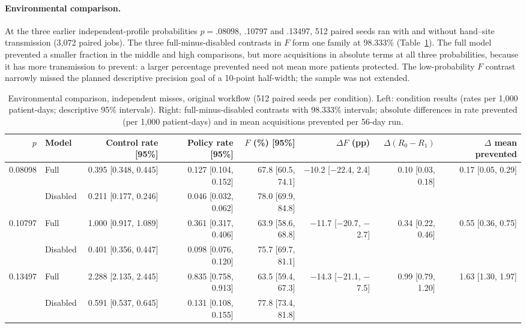 \documentclass[11pt]{article}
\newcommand{\mn}{\ensuremath{-}}
\begin{document}
\paragraph{Environmental comparison.} At the three earlier
independent-profile probabilities $p=.08098$, .10797 and .13497, 512 paired seeds
ran with and without hand--site transmission (3,072 paired jobs). The three
full-minus-disabled contrasts in $F$ form one family at 98.333\%
(Table~\ref{tab:env}). The full model prevented a smaller fraction in the middle
and high comparisons, but more acquisitions in absolute terms at all three
probabilities, because it has more transmission to prevent: a larger percentage
prevented need not mean more patients protected. The low-probability $F$
contrast narrowly missed the planned descriptive precision goal of a 10-point
half-width; the sample was not extended.

\begin{table}[htbp]\centering\footnotesize\setlength{\tabcolsep}{3pt}
\caption{Environmental comparison, independent misses, original workflow (512 paired seeds per condition). Left: condition results (rates per 1,000 patient-days; descriptive 95\% intervals). Right: full-minus-disabled contrasts with 98.333\% intervals; absolute differences in rate prevented (per 1,000 patient-days) and in mean acquisitions prevented per 56-day run.}\label{tab:env}
\begin{adjustbox}{max width=\linewidth}
\begin{tabular}{rlrrr@{\hspace{12pt}}rrr}\toprule
$p$ & Model & Control rate [95\%] & Policy rate [95\%] & $F$ (\%) [95\%] & $\Delta F$ (pp) & $\Delta(R_0-R_1)$ & $\Delta$ mean prevented\\\midrule
0.08098 & Full & 0.395 [0.348, 0.445] & 0.127 [0.104, 0.152] & 67.8 [60.5, 74.1] & $\mn$10.2 [$\mn$22.4, 2.4] & 0.10 [0.03, 0.18] & 0.17 [0.05, 0.29]\\
 & Disabled & 0.211 [0.177, 0.246] & 0.046 [0.032, 0.062] & 78.0 [69.9, 84.8] & & & \\
0.10797 & Full & 1.000 [0.917, 1.089] & 0.361 [0.317, 0.406] & 63.9 [58.6, 68.8] & $\mn$11.7 [$\mn$20.7, $\mn$2.7] & 0.34 [0.22, 0.46] & 0.55 [0.36, 0.75]\\
 & Disabled & 0.401 [0.356, 0.447] & 0.098 [0.076, 0.120] & 75.7 [69.7, 81.1] & & & \\
0.13497 & Full & 2.288 [2.135, 2.445] & 0.835 [0.758, 0.913] & 63.5 [59.4, 67.3] & $\mn$14.3 [$\mn$21.1, $\mn$7.5] & 0.99 [0.79, 1.20] & 1.63 [1.30, 1.97]\\
 & Disabled & 0.591 [0.537, 0.645] & 0.131 [0.108, 0.155] & 77.8 [73.4, 81.8] & & & \\
\bottomrule\end{tabular}
\end{adjustbox}
\end{table}
\end{document}
